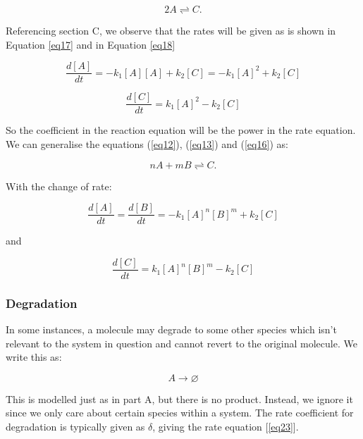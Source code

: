 \documentclass[11pt, letterpaper, english]{article}
\begin{document}
    \begin{equation}
        2A \rightleftharpoons C.
        \label{eq16}
    \end{equation}

    \par{Referencing section C, we observe that the rates will be given as is shown in Equation \ref{eq17} and in Equation \ref{eq18}}

    \begin{equation}
        \frac{d [A]}{d t}=-k_1[A][A]+k_2[C]=-k_1{[A]}^2+k_2[C]
        \label{eq17}
    \end{equation}

    \begin{equation}
        \frac{d [C]}{d t}=k_1[A]^2-k_2[C]
        \label{eq18}
    \end{equation}

    \par{So the coefficient in the reaction equation will be the power in the rate equation. We can generalise the equations (\ref{eq12}), (\ref{eq13}) and (\ref{eq16}) as:}

    \begin{equation}
        nA+mB \rightleftharpoons C.
    \end{equation}

    \par{With the change of rate:}

    \begin{equation}
        \frac{d [A]}{d t}=\frac{d [B]}{d t}=-k_1{[A]}^n[B]^m+k_2[C]
    \end{equation}

    \par{and}

    \begin{equation}
        \frac{d [C]}{d t}=k_1[A]^n[B]^m-k_2[C]
    \end{equation}


    \subsubsection{Degradation}

    \par{In some instances, a molecule may degrade to some other species which isn’t relevant to the system in question and cannot revert to the original molecule. We write this as:}
    
    \begin{equation}
        A \longrightarrow  \varnothing
    \end{equation}
    \par{This is modelled just as in part A, but there is no product. Instead, we ignore it since we only care about certain species within a system. The rate coefficient for degradation is typically given as $\delta$, giving the rate equation [\ref{eq23}].}
    
\end{document}
